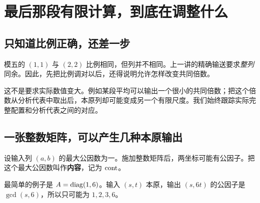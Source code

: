 \chapter{最后那段有限计算，到底在调整什么}\label{sec:controllers}
\section{只知道比例正确，还差一步}
模五的 $(1,1)$ 与 $(2,2)$ 比例相同，但列并不相同。上一讲的精确输送要求\emph{整列}同余。因此，先把比例调对以后，还得说明允许怎样改变共同倍数。

这不是要求实际数值变大。例如某段平均可以输出一个很小的共同倍数；把这个倍数从分析代表中取出后，本原列却可能变成另一个有限尺度。我们始终跟踪实际完整配置和分析代表之间的对应。

\section{一张整数矩阵，可以产生几种本原输出}
设输入列 $(a,b)$ 的最大公因数为一。施加整数矩阵后，两坐标可能有公因子。把这个最大公因数叫作\textbf{内容}，记为 $\operatorname{cont}$。

最简单的例子是 $A=\operatorname{diag}(1,6)$。输入 $(s,t)$ 本原，输出 $(s,6t)$ 的公因子是 $\gcd(s,6)$，所以只可能为 $1,2,3,6$。

